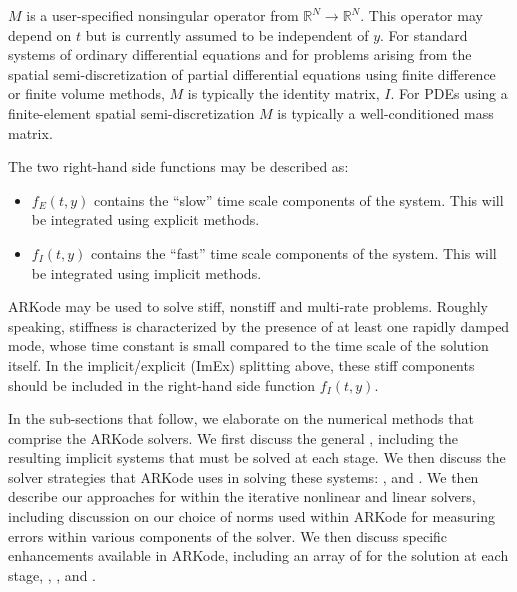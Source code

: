 \documentclass[letterpaper,10pt,english]{sphinxmanual}
\begin{document}
\(M\) is a user-specified nonsingular operator from
\(\mathbb{R}^N \to \mathbb{R}^N\).  This operator may depend on
\(t\) but is currently assumed to be independent of \(y\).
For standard systems of ordinary differential equations and for
problems arising from the spatial semi-discretization of partial
differential equations using finite difference or finite volume
methods, \(M\) is typically the identity matrix, \(I\).  For
PDEs using a finite-element spatial semi-discretization \(M\) is
typically a well-conditioned mass matrix.

The two right-hand side functions may be described as:
\begin{itemize}
\item {} 
\(f_E(t,y)\) contains the ``slow'' time scale components of the
system.  This will be integrated using explicit methods.

\item {} 
\(f_I(t,y)\) contains the ``fast'' time scale components of the
system.  This will be integrated using implicit methods.

\end{itemize}

ARKode may be used to solve stiff, nonstiff and multi-rate problems.
Roughly speaking, stiffness is characterized by the presence of at
least one rapidly damped mode, whose time constant is small compared
to the time scale of the solution itself.  In the implicit/explicit
(ImEx) splitting above, these stiff components should be included in
the right-hand side function \(f_I(t,y)\).

In the sub-sections that follow, we elaborate on the numerical
methods that comprise the ARKode solvers.  We first discuss the
general {\hyperref[Mathematics:mathematics-ark]{\emph{}}}, including the resulting implicit systems that must
be solved at each stage.  We then discuss the solver strategies that
ARKode uses in solving these systems: {\hyperref[Mathematics:mathematics-nonlinear]{\emph{}}}, {\hyperref[Mathematics:mathematics-linear]{\emph{}}}
and {\hyperref[Mathematics:mathematics-preconditioning]{\emph{}}}.  We then
describe our approaches for {\hyperref[Mathematics:mathematics-error]{\emph{}}}
within the iterative nonlinear and linear solvers, including
discussion on our choice of norms used within ARKode for measuring
errors within various components of the solver.  We then discuss
specific enhancements available in ARKode, including an array of
{\hyperref[Mathematics:mathematics-predictors]{\emph{}}} for the solution
at each stage, {\hyperref[Mathematics:mathematics-adaptivity]{\emph{}}}, {\hyperref[Mathematics:mathematics-masssolve]{\emph{}}}, and {\hyperref[Mathematics:mathematics-rootfinding]{\emph{}}}.
\end{document}
